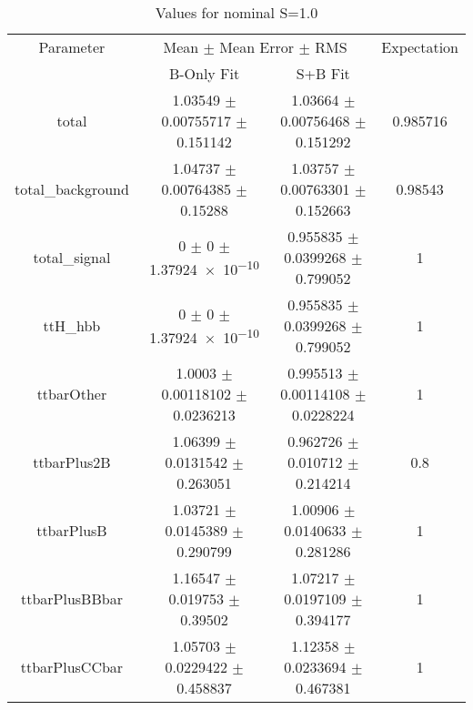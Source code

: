 \begin{table}
\centering
\caption{Values for nominal S=1.0}
\begin{tabular}{cccc}
\toprule
Parameter & \multicolumn{2}{c}{Mean $\pm$ Mean Error $\pm$ RMS} & Expectation\\
 & B-Only Fit & S+B Fit & \\
\midrule
total & \num{1.03549} $\pm$ \num{0.00755717} $\pm$ \num{0.151142} & \num{1.03664} $\pm$ \num{0.00756468} $\pm$ \num{0.151292} & \num{0.985716}\\
total\_background & \num{1.04737} $\pm$ \num{0.00764385} $\pm$ \num{0.15288} & \num{1.03757} $\pm$ \num{0.00763301} $\pm$ \num{0.152663} & \num{0.98543}\\
total\_signal & \num{0} $\pm$ \num{0} $\pm$ \num{1.37924e-10} & \num{0.955835} $\pm$ \num{0.0399268} $\pm$ \num{0.799052} & \num{1}\\
ttH\_hbb & \num{0} $\pm$ \num{0} $\pm$ \num{1.37924e-10} & \num{0.955835} $\pm$ \num{0.0399268} $\pm$ \num{0.799052} & \num{1}\\
ttbarOther & \num{1.0003} $\pm$ \num{0.00118102} $\pm$ \num{0.0236213} & \num{0.995513} $\pm$ \num{0.00114108} $\pm$ \num{0.0228224} & \num{1}\\
ttbarPlus2B & \num{1.06399} $\pm$ \num{0.0131542} $\pm$ \num{0.263051} & \num{0.962726} $\pm$ \num{0.010712} $\pm$ \num{0.214214} & \num{0.8}\\
ttbarPlusB & \num{1.03721} $\pm$ \num{0.0145389} $\pm$ \num{0.290799} & \num{1.00906} $\pm$ \num{0.0140633} $\pm$ \num{0.281286} & \num{1}\\
ttbarPlusBBbar & \num{1.16547} $\pm$ \num{0.019753} $\pm$ \num{0.39502} & \num{1.07217} $\pm$ \num{0.0197109} $\pm$ \num{0.394177} & \num{1}\\
ttbarPlusCCbar & \num{1.05703} $\pm$ \num{0.0229422} $\pm$ \num{0.458837} & \num{1.12358} $\pm$ \num{0.0233694} $\pm$ \num{0.467381} & \num{1}\\
\bottomrule
\end{tabular}
\end{table}